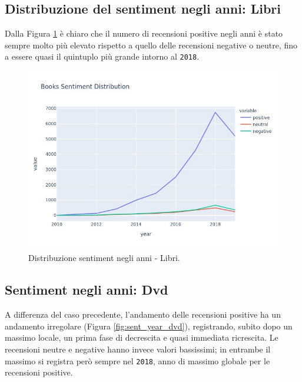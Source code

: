 		\subsection{Distribuzione del sentiment negli anni: Libri}
			Dalla Figura \ref{fig:sent_year_books} è chiaro che il numero di recensioni positive negli anni è stato sempre molto più elevato rispetto a quello delle recensioni negative o neutre, fino a essere quasi il quintuplo più grande intorno al \verb|2018|. 
			
			\begin{figure} [h]
				\includegraphics[width=\textwidth]{Figure/sent_year_books}
				\caption{Distribuzione sentiment negli anni - Libri.}
				\label{fig:sent_year_books}
			\end{figure}
		
		\subsection{Sentiment negli anni: Dvd}
			A differenza del caso precedente, l'andamento delle recensioni positive ha un andamento irregolare (Figura \ref{fig:sent_year_dvd}), registrando, subito dopo un massimo locale, un prima fase di  decrescita e quasi immediata ricrescita. Le recensioni neutre e negative hanno invece valori bassissimi; in entrambe il massimo si registra però sempre nel \verb|2018|, anno di massimo globale per le recensioni positive.
			
